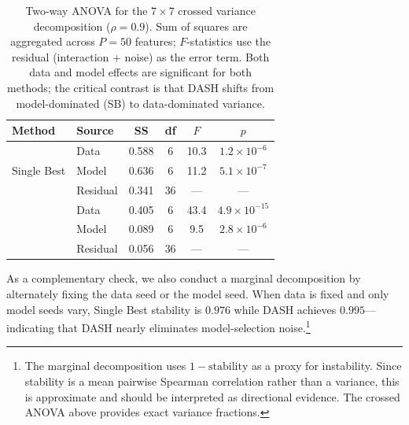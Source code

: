 \documentclass[11pt]{article}
\newcommand{\dash}{\textsc{DASH}}
\newcommand{\rhovar}{\rho}
\begin{document}
\begin{table}[htbp]
\centering
\caption{Two-way ANOVA for the $7 \times 7$ crossed variance
decomposition ($\rhovar = 0.9$). Sum of squares are aggregated across
$P = 50$ features; $F$-statistics use the residual (interaction +
noise) as the error term.\protect\footnotemark{}
Both data and model effects are significant for both
methods; the critical contrast is that \dash{} shifts from
model-dominated (SB) to data-dominated variance.}
\label{tab:anova}
\small
\begin{tabular}{llcccc}
\toprule
\textbf{Method} & \textbf{Source} & \textbf{SS} & \textbf{df} & $F$ & $p$ \\
\midrule
\multirow{3}{*}{Single Best}
  & Data     & 0.588 & 6  & 10.3 & $1.2 \times 10^{-6}$ \\
  & Model    & 0.636 & 6  & 11.2 & $5.1 \times 10^{-7}$ \\
  & Residual & 0.341 & 36 & ---  & --- \\
\addlinespace
\multirow{3}{*}{\dash{} (MaxMin)}
  & Data     & 0.405 & 6  & 43.4 & $4.9 \times 10^{-15}$ \\
  & Model    & 0.089 & 6  & \phantom{0}9.5 & $2.8 \times 10^{-6}$ \\
  & Residual & 0.056 & 36 & ---  & --- \\
\bottomrule
\end{tabular}
\end{table}

As a complementary check, we also conduct a marginal decomposition by
alternately fixing the data seed or the model seed. When data is fixed
and only model seeds vary, Single Best stability is $0.976$ while
\dash{} achieves $0.995$---indicating that \dash{} nearly eliminates
model-selection noise.\footnote{The marginal decomposition uses
$1 - \text{stability}$ as a proxy for instability. Since stability is a
mean pairwise Spearman correlation rather than a variance, this is
approximate and should be interpreted as directional evidence. The
crossed ANOVA above provides exact variance fractions.}
\end{document}
